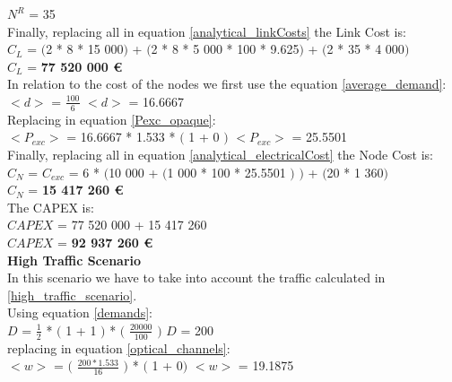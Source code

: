 $N^R$ = 35\\

Finally, replacing all in equation \ref{analytical_linkCosts} the Link Cost is:\\

$C_L$ = $($2 * 8 * 15 000$)$ + $($2 * 8 * 5 000 * 100 * 9.625$)$ + $($2 * 35 * 4 000$)$\\

$C_L$ = \textbf{77 520 000 \euro}\\

In relation to the cost of the nodes we first use the equation \ref{average_demand}:\\

$<d>$ = $\frac{100}{6}$ \qquad \qquad $<d>$ = 16.6667\\

Replacing in equation \ref{Pexc_opaque}:\\

$<P_{exc}>$ = 16.6667 * 1.533 * $($ 1 + 0 $)$ \qquad \qquad $<P_{exc}>$ = 25.5501 \\

Finally, replacing all in equation \ref{analytical_electricalCost} the Node Cost is:\\

$C_N$ = $C_{exc}$ = 6 * $($10 000 + $($1 000 * 100 * 25.5501 $)$ $)$ + $($20 * 1 360$)$\\

$C_N$ = \textbf{15 417 260 \euro}\\

The CAPEX is:\\
$CAPEX$ = 77 520 000 + 15 417 260\\

$CAPEX$ = \textbf{92 937 260 \euro}\\

\textbf{High Traffic Scenario}\\
In this scenario we have to take into account the traffic calculated in \ref{high_traffic_scenario}.\\

Using equation \ref{demands}:\\

$D$ = $\frac{1}{2}$ * $($ 1 + 1 $)$ * $($ $\frac{20 000}{100}$ $)$ \qquad \qquad $D$ = 200\\

replacing in equation \ref{optical_channels}:\\

$<w>$ = $($ $\frac{200 * 1.533}{16}$ $)$ * $($ 1 + 0$)$ \qquad \quad $<w>$ = 19.1875\\

